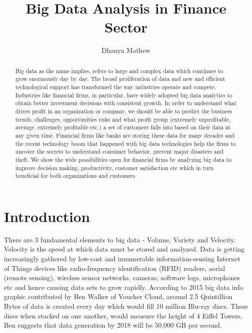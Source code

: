 \documentclass[sigconf]{acmart}
\begin{document}
\title{Big Data Analysis in Finance Sector}


\author{Dhanya Mathew}

\renewcommand{\shortauthors}{B. Trovato et al.}


\begin{abstract}

Big data as the name implies, refers to large and complex data which continues to grow enormously day by day. The broad proliferation of data and new and efficient technological support has transformed the way industries operate and compete. Industries like financial firms, in particular, have widely adopted big data analytics to obtain better investment decisions with consistent growth. In order to understand what drives profit in an organization or company, we should be able to predict the business trends, challenges, opportunities risks and what profit group (extremely unprofitable, average, extremely profitable etc.) a set of customers falls into based on their data at any given time. Financial firms like banks are storing these data for many decades and the recent technology boom that happened with big data technologies help the firms to uncover the secrets to understand consumer behavior, prevent major disasters and theft. We show the wide possibilities open for financial firms by analyzing big data to improve decision making, productivity, customer satisfaction etc which in turn beneficial for both organizations and customers.
\end{abstract}



\maketitle

\section{Introduction}

There are 3 fundamental elements to big data - Volume, Variety and Velocity. Velocity is the speed at which data must be stored and analyzed\cite{how-big-data-has-changed-finance}. Data is getting increasingly gathered by low-cost and innumerable information-sensing Internet of Things devices like radio-frequency identification (RFID) readers, aerial (remote sensing), wireless sensor networks, cameras, software logs, microphones etc and hence causing data sets to grow rapidly\cite{wiki-bigdata}. According to 2015 big data info graphic contributed by Ben Walker of Voucher Cloud, around 2.5 Quintillion Bytes of data is created every day which would fill 10 million Blu-ray discs. These discs when stacked on one another, would measure the height of 4 Eiffel Towers. Ben suggests that data generation by 2018 will be 50,000 GB per second\cite{how-much-data-is-created-daily}. 
\end{document}
